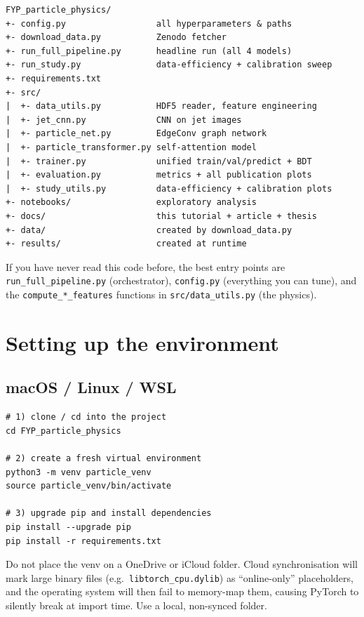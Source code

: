 \documentclass[11pt,a4paper]{article}
\begin{document}
\begin{lstlisting}[style=shell,caption={Top-level directory tree.}]
FYP_particle_physics/
+- config.py                  all hyperparameters & paths
+- download_data.py           Zenodo fetcher
+- run_full_pipeline.py       headline run (all 4 models)
+- run_study.py               data-efficiency + calibration sweep
+- requirements.txt
+- src/
|  +- data_utils.py           HDF5 reader, feature engineering
|  +- jet_cnn.py              CNN on jet images
|  +- particle_net.py         EdgeConv graph network
|  +- particle_transformer.py self-attention model
|  +- trainer.py              unified train/val/predict + BDT
|  +- evaluation.py           metrics + all publication plots
|  +- study_utils.py          data-efficiency + calibration plots
+- notebooks/                 exploratory analysis
+- docs/                      this tutorial + article + thesis
+- data/                      created by download_data.py
+- results/                   created at runtime
\end{lstlisting}

\begin{tipbox}
If you have never read this code before, the best entry points are
\texttt{run\_full\_pipeline.py} (orchestrator), \texttt{config.py}
(everything you can tune), and the \texttt{compute\_*\_features}
functions in \texttt{src/data\_utils.py} (the physics).
\end{tipbox}

\section{Setting up the environment}\label{sec:setup}

\subsection{macOS / Linux / WSL}
\begin{lstlisting}[style=shell]
# 1) clone / cd into the project
cd FYP_particle_physics

# 2) create a fresh virtual environment
python3 -m venv particle_venv
source particle_venv/bin/activate

# 3) upgrade pip and install dependencies
pip install --upgrade pip
pip install -r requirements.txt
\end{lstlisting}

\begin{warnbox}
Do not place the venv on a OneDrive or iCloud folder. Cloud
synchronisation will mark large binary files (e.g.\
\texttt{libtorch\_cpu.dylib}) as ``online-only'' placeholders, and
the operating system will then fail to memory-map them, causing
PyTorch to silently break at import time. Use a local, non-synced
folder.
\end{warnbox}
\end{document}
